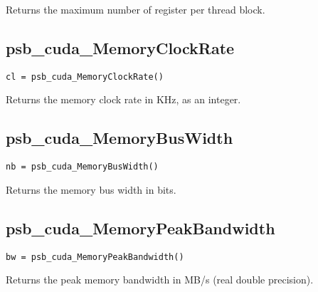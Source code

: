 Returns the maximum number of register per thread block. 


\subsection*{psb\_cuda\_MemoryClockRate }

\begin{verbatim}
cl = psb_cuda_MemoryClockRate()
\end{verbatim}

Returns the memory clock rate in KHz, as an integer. 

\subsection*{psb\_cuda\_MemoryBusWidth }

\begin{verbatim}
nb = psb_cuda_MemoryBusWidth()
\end{verbatim}

Returns the memory bus width in bits.

\subsection*{psb\_cuda\_MemoryPeakBandwidth }

\begin{verbatim}
bw = psb_cuda_MemoryPeakBandwidth()
\end{verbatim}
Returns the peak memory bandwidth in MB/s (real double precision).



